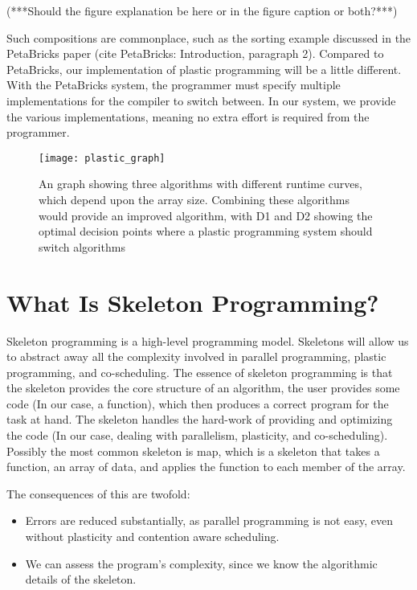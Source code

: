 (***Should the figure explanation be here or in the figure caption or both?***)

Such compositions are commonplace, such as the sorting example discussed in the PetaBricks paper (cite PetaBricks: Introduction, paragraph 2). Compared to PetaBricks, our implementation of plastic programming will be a little different. With the PetaBricks system, the programmer must specify multiple implementations for the compiler to switch between. In our system, we provide the various implementations, meaning no extra effort is required from the programmer.



\begin{figure}
	\texttt{[image: plastic\_graph]}
	\caption{An graph showing three algorithms with different runtime curves, which depend upon the array size. Combining these algorithms would provide an improved algorithm, with D1 and D2 showing the optimal decision points where a plastic programming system should switch algorithms}
	\label{fig:plastic_graph}
\end{figure}



\section{What Is Skeleton Programming?}
\label{section:background_skeleton_programming}

Skeleton programming is a high-level programming model. Skeletons will allow us to abstract away all the complexity involved in parallel programming, plastic programming, and co-scheduling. The essence of skeleton programming is that the skeleton provides the core structure of an algorithm, the user provides some code (In our case, a function), which then produces a correct program for the task at hand. The skeleton handles the hard-work of providing and optimizing the code (In our case, dealing with parallelism, plasticity, and co-scheduling). Possibly the most common skeleton is map, which is a skeleton that takes a function, an array of data, and applies the function to each member of the array. 

The consequences of this are twofold:

\begin{itemize}
	\item Errors are reduced substantially, as parallel programming is not easy, even without plasticity and contention aware scheduling.
	\item We can assess the program's complexity, since we know the algorithmic details of the skeleton.
\end{itemize}

